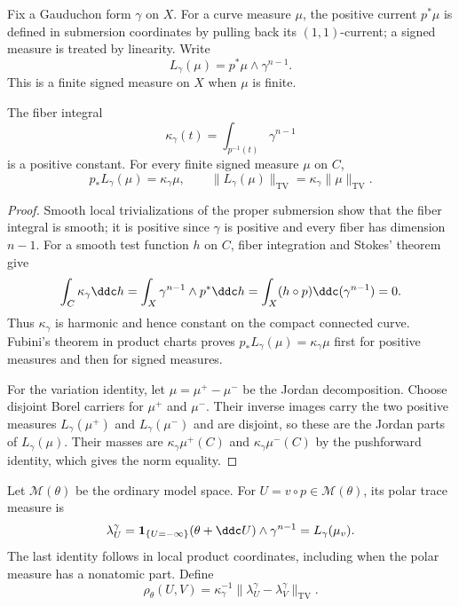 Fix a Gauduchon form $\gamma$ on $X$. For a curve measure $\mu$,
the positive current $p^*\mu$ is defined in submersion coordinates
by pulling back its $(1,1)$-current; a signed measure is treated
by linearity. Write
\[
 L_\gamma(\mu)=p^*\mu\wedge\gamma^{n-1}.
\]
This is a finite signed measure on $X$ when $\mu$ is finite.

\begin{lemma}\label{fibration:gauduchon-fiber-volume}
The fiber integral
\[
 \kappa_\gamma(t)=\int_{p^{-1}(t)}\gamma^{n-1}
\]
is a positive constant. For every finite signed measure $\mu$ on $C$,
\[
 p_*L_\gamma(\mu)=\kappa_\gamma\mu,\qquad
 \|L_\gamma(\mu)\|_{\mathrm{TV}}
             =\kappa_\gamma\|\mu\|_{\mathrm{TV}}.
\]
\end{lemma}
\begin{proof}
Smooth local trivializations of the proper submersion show that
the fiber integral is smooth; it is positive since $\gamma$ is
positive and every fiber has dimension $n-1$. For a smooth test
function $h$ on $C$, fiber integration and Stokes' theorem give
\[
 \int_C\kappa_\gamma\ddc h
 =\int_X\gamma^{n-1}\wedge p^*\ddc h
 =\int_X(h\circ p)\ddc(\gamma^{n-1})=0.
\]
Thus $\kappa_\gamma$ is harmonic and hence constant on the compact
connected curve. Fubini's theorem in product charts proves
$p_*L_\gamma(\mu)=\kappa_\gamma\mu$ first for positive measures
and then for signed measures.

For the variation identity, let $\mu=\mu^+-\mu^-$ be the Jordan
decomposition. Choose disjoint Borel carriers for $\mu^+$ and
$\mu^-$. Their inverse images carry the two positive measures
$L_\gamma(\mu^+)$ and $L_\gamma(\mu^-)$ and are disjoint, so these
are the Jordan parts of $L_\gamma(\mu)$. Their masses are
$\kappa_\gamma\mu^+(C)$ and $\kappa_\gamma\mu^-(C)$ by the
pushforward identity, which gives the norm equality.
\end{proof}

Let $\mathcal M(\theta)$ be the ordinary model space. For
$U=v\circ p\in\mathcal M(\theta)$, its polar trace measure is
\[
 \lambda_U^\gamma
 =\mathbf1_{\{U=-\infty\}}
       (\theta+\ddc U)\wedge\gamma^{n-1}
 =L_\gamma(\mu_v).
\]
The last identity follows in local product coordinates, including
when the polar measure has a nonatomic part. Define
\[
 \rho_\theta(U,V)=\kappa_\gamma^{-1}
                  \|\lambda_U^\gamma-\lambda_V^\gamma\|_{\mathrm{TV}}.
\]

